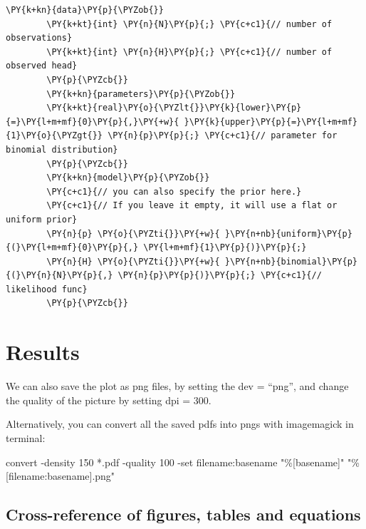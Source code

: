 \documentclass[
	letterpaper,
	DIV=11,
	numbers=noendperiod]{scrartcl}
\newenvironment{Shaded}{\begin{snugshade}}{\end{snugshade}}
\newcommand{\AttributeTok}[1]{\textcolor[rgb]{0.40,0.45,0.13}{#1}}
\newcommand{\ExtensionTok}[1]{\textcolor[rgb]{0.00,0.23,0.31}{#1}}
\newcommand{\NormalTok}[1]{\textcolor[rgb]{0.00,0.23,0.31}{#1}}
\newcommand{\PreprocessorTok}[1]{\textcolor[rgb]{0.68,0.00,0.00}{#1}}
\newcommand{\StringTok}[1]{\textcolor[rgb]{0.13,0.47,0.30}{#1}}
\begin{document}
\begin{Shaded}
	\begin{Verbatim}[commandchars=\\\{\}]
		\PY{k+kn}{data}\PY{p}{\PYZob{}}
		\PY{k+kt}{int} \PY{n}{N}\PY{p}{;} \PY{c+c1}{// number of observations}
		\PY{k+kt}{int} \PY{n}{H}\PY{p}{;} \PY{c+c1}{// number of observed head}
		\PY{p}{\PYZcb{}}
		\PY{k+kn}{parameters}\PY{p}{\PYZob{}}
		\PY{k+kt}{real}\PY{o}{\PYZlt{}}\PY{k}{lower}\PY{p}{=}\PY{l+m+mf}{0}\PY{p}{,}\PY{+w}{ }\PY{k}{upper}\PY{p}{=}\PY{l+m+mf}{1}\PY{o}{\PYZgt{}} \PY{n}{p}\PY{p}{;} \PY{c+c1}{// parameter for binomial distribution}
		\PY{p}{\PYZcb{}}
		\PY{k+kn}{model}\PY{p}{\PYZob{}}
		\PY{c+c1}{// you can also specify the prior here.}
		\PY{c+c1}{// If you leave it empty, it will use a flat or uniform prior}
		\PY{n}{p} \PY{o}{\PYZti{}}\PY{+w}{ }\PY{n+nb}{uniform}\PY{p}{(}\PY{l+m+mf}{0}\PY{p}{,} \PY{l+m+mf}{1}\PY{p}{)}\PY{p}{;}
		\PY{n}{H} \PY{o}{\PYZti{}}\PY{+w}{ }\PY{n+nb}{binomial}\PY{p}{(}\PY{n}{N}\PY{p}{,} \PY{n}{p}\PY{p}{)}\PY{p}{;} \PY{c+c1}{// likelihood func}
		\PY{p}{\PYZcb{}}
	\end{Verbatim}
\end{Shaded}

\hypertarget{results}{%
	\section{Results}\label{results}}

We can also save the plot as png files, by setting the dev = ``png'',
and change the quality of the picture by setting dpi = 300.

Alternatively, you can convert all the saved pdfs into pngs with
imagemagick in terminal:

\begin{Shaded}
	\begin{Highlighting}[]
		\ExtensionTok{convert} \AttributeTok{{-}density}\NormalTok{ 150 }\PreprocessorTok{*}\NormalTok{.pdf }\AttributeTok{{-}quality}\NormalTok{ 100 }\AttributeTok{{-}set}\NormalTok{ filename:basename }\StringTok{"\%[basename]"} \StringTok{"\%[filename:basename].png"}
	\end{Highlighting}
\end{Shaded}

\hypertarget{cross-reference-of-figures-tables-and-equations}{%
	\subsection{Cross-reference of figures, tables and
		equations}\label{cross-reference-of-figures-tables-and-equations}}
\end{document}
